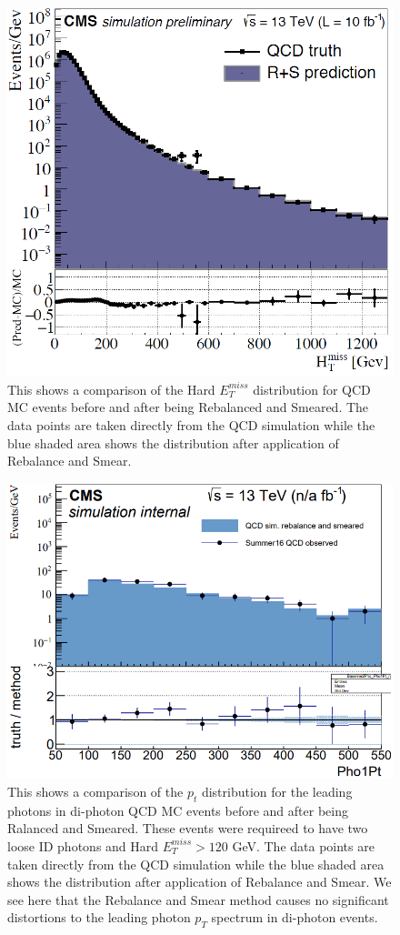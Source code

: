 \begin{figure}[h]
	\centering
	\includegraphics[width=0.9\linewidth]{Figures/RandSclosure}
	\caption[Hard $E_T^{miss}$ distribution for QCD MC events before and after being Rebalanced and Smeared.]{This shows a comparison of the Hard $E_T^{miss}$ distribution for QCD MC events before and after being Rebalanced and Smeared.  The data points are taken directly from the QCD simulation while the blue shaded area shows the distribution after application of Rebalance and Smear.}
	\label{fig:randsclosure}
\end{figure}
\begin{figure}[h]
	\centering
	\includegraphics[width=0.9\linewidth]{Figures/RandS_Pho1_closure}
	\caption[Leading photon $p_T$ distrubutions for di-photon QCD MC events before and after Rebalance and Smear implimentation.]{This shows a comparison of the $p_t$ distribution for the leading photons in di-photon QCD MC events before and after being Ralanced and Smeared. These events were requireed to have two loose ID photons and Hard $E_T^{miss}>120$ GeV. The data points are taken directly from the QCD simulation while the blue shaded area shows the distribution after application of Rebalance and Smear. We see here that the Rebalance and Smear method causes no significant distortions to the leading photon $p_T$ spectrum in di-photon events.}
	\label{fig:randspho1closure}
\end{figure}

